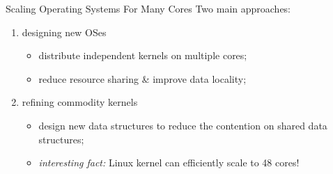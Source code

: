 \documentclass{beamer}
\begin{document}
\begin{frame}{Scaling Operating Systems For Many Cores}
  Two main approaches:
  \begin{enumerate}
    \item designing new OSes
      \begin{itemize}
        \item distribute independent kernels on multiple cores;
        \item reduce resource sharing \& improve data locality;
      \end{itemize}
    \item refining commodity kernels
      \begin{itemize}
        \item design new data structures to reduce the contention on
          shared data structures;
        \item \emph{interesting fact:} Linux kernel can efficiently scale to 48
          cores!
      \end{itemize}
  \end{enumerate}
\end{frame}
\end{document}
